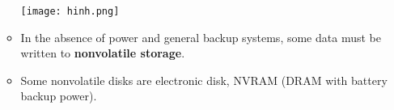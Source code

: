 \documentclass[10pt]{article}
\begin{document}
\begin{enumerate}
\begin{itemize}
		\bigbreak
		\texttt{[image: hinh.png]}
		\bigbreak

		\item In the absence of power and general backup systems, some data must be written to \textbf{nonvolatile storage}.
		\item Some nonvolatile disks are electronic disk, NVRAM (DRAM with battery backup power).
	\end{itemize}

\end{enumerate}
\end{document}

